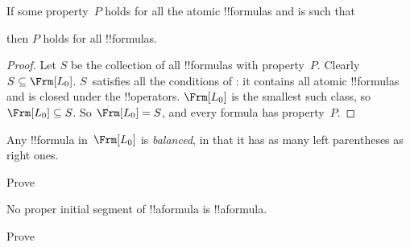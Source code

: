 \documentclass[../../../include/open-logic-section]{subfiles}
\begin{document}


\begin{thm}
  If some property~$P$ holds for all the atomic !!{formula}s and is
  such that
  \begin{enumerate}
  \end{enumerate}
  then $P$ holds for all !!{formula}s.
\end{thm}

\begin{proof}
  Let $S$ be the collection of all !!{formula}s with
  property~$P$. Clearly $S \subseteq \Frm[L_0]$. $S$~satisfies all the
  conditions of : it contains all atomic
  !!{formula}s and is closed under the !!{operator}s.  $\Frm[L_0]$ is
  the smallest such class, so $\Frm[L_0] \subseteq S$. So $\Frm[L_0] = S$, and
  every formula has property~$P$.
\end{proof}

\begin{prop}
   Any !!{formula} in~$\Frm[L_0]$ is \emph{balanced}, in that it has
   as many left parentheses as right ones.
\end{prop}

\begin{prob}
Prove 
\end{prob}

\begin{prop} 
No proper initial segment of !!a{formula} is !!a{formula}.
\end{prop}

\begin{prob}
  Prove 
\end{prob}
\end{document}
